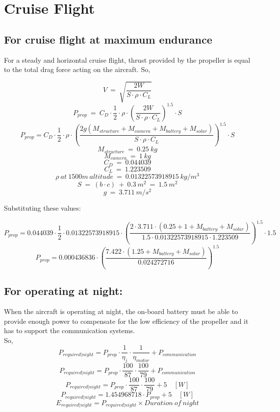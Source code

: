 \chapter{Cruise Flight}
\label{chap: Cruise Flight}

\section{For cruise flight at maximum endurance}

\p For a steady and horizontal cruise flight, thrust provided by the propeller is equal to the total drag force acting on the aircraft. So,


\[ V \ = \ \sqrt{\frac{2W}{S \cdot \rho \cdot C_L }} \]
\[ P_{prop} \ = \  C_D \cdot \frac{1}{2} \cdot \rho \cdot \left(\frac{2W}{S \cdot \rho \cdot C_L }\right)^{1.5} \cdot S \]
\[ P_{prop} = C_D \cdot \frac{1}{2} \cdot \rho \cdot \left(\frac{2g(M_{structure} + M_{camera} + M_{battery} + M_{solar})}{S \cdot \rho \cdot C_L} \right)^{1.5} \cdot S \]
\[ M_{structure} \ = \ 0.25 \ kg \]
\[ M_{camera} \ = \ 1 \ kg \]
\[ C_D \ = \ 0.044039 \]
\[ C_L \ = \ 1.223509 \]
\[ \rho \ at \ 1500m \ altitude \ = \ 0.01322573918915 \ kg/m^3 \]
\[ S \ = \ ( b \cdot c ) \ + \ 0.3 \ m^2 \ = \ 1.5 \ m^2\]
\[ g \ = \ 3.711 \ m/s^2 \]

Substituting these values:

\[ P_{prop} = 0.044039 \cdot \frac{1}{2} \cdot 0.01322573918915 \cdot \left(\frac{2 \cdot 3.711 \cdot (0.25 + 1 + M_{battery} + M_{solar})}{1.5 \cdot 0.01322573918915 \cdot 1.223509} \right)^{1.5} \cdot 1.5 \]
\[ P_{prop} = 0.000436836 \cdot \left(\frac{7.422 \cdot (1.25 + M_{battery} + M_{solar})}{ 0.024272716 } \right)^{1.5} \]


\section{For operating at night:}

\p When the aircraft is operating at night, the on-board battery must be able to provide enough power to compensate for the low efficiency of the propeller and it has to support the communication systems. \\
\p So,
\[ P_{required | night} = P_{prop} \cdot \frac{1}{\eta_j} \cdot \frac{1}{\eta_{motor}} + P_{communication} \]
\[ P_{required | night} = P_{prop} \cdot \frac{100}{87} \cdot \frac{100}{79} + P_{communication} \]
\[ P_{required | night} = P_{prop} \cdot \frac{100}{87} \cdot \frac{100}{79} + 5 \quad [W] \]
\[ P_{required | night} = 1.454968718 \cdot P_{prop} + 5 \quad [W] \]
\[ E_{required | night} = P_{required | night} \times Duration \ of \ night \]

